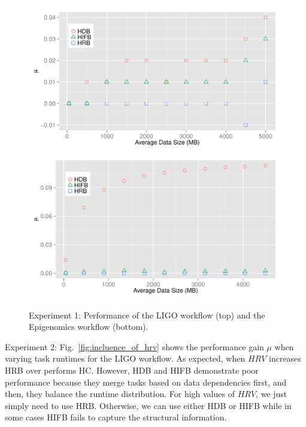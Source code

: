 
\begin{figure}[htb]
	\centering
	\includegraphics[width=\linewidth]{figures/imbalance/exp2_ligo.pdf}
	\includegraphics[width=\linewidth]{figures/imbalance/exp2_genome.pdf}
	\caption{Experiment 1: Performance of the LIGO workflow (top) and the Epigenomics workflow (bottom).}
	\label{fig:imbalance_performance}
	\vspace{-10pt}
\end{figure}

Experiment 2: Fig.~\ref{fig:incluence_of_hrv} shows the performance gain $\mu$ when varying task runtimes for the LIGO workflow. As expected, when $HRV$ increases HRB over performs HC. However, HDB and HIFB demonstrate poor performance because they merge tasks based on data dependencies first, and then, they balance the runtime distribution. 
For high values of $HRV$, we just simply need to use HRB. Otherwise, we can use either HDB or HIFB while in some cases HIFB fails to capture the structural information. 

